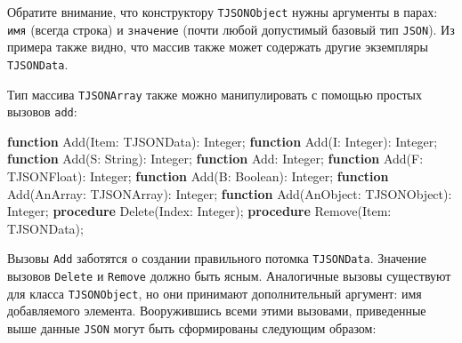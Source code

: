 \documentclass[
]{article}
\newenvironment{Shaded}{}{}
\newcommand{\DataTypeTok}[1]{\textcolor[rgb]{0.56,0.13,0.00}{#1}}
\newcommand{\KeywordTok}[1]{\textcolor[rgb]{0.00,0.44,0.13}{\textbf{#1}}}
\newcommand{\NormalTok}[1]{#1}
\begin{document}
Обратите внимание, что конструктору \texttt{TJSONObject} нужны аргументы
в парах: \texttt{имя} (всегда строка) и \texttt{значение} (почти любой
допустимый базовый тип \texttt{JSON}). Из примера также видно, что
массив также может содержать другие экземпляры \texttt{TJSONData}.

Тип массива \texttt{TJSONArray} также можно манипулировать с помощью
простых вызовов \texttt{add}:

\begin{Shaded}
\begin{Highlighting}[]
\KeywordTok{function}\NormalTok{ Add(Item: TJSONData): }\DataTypeTok{Integer}\NormalTok{;}
\KeywordTok{function}\NormalTok{ Add(I: }\DataTypeTok{Integer}\NormalTok{): }\DataTypeTok{Integer}\NormalTok{;}
\KeywordTok{function}\NormalTok{ Add(S: }\DataTypeTok{String}\NormalTok{): }\DataTypeTok{Integer}\NormalTok{;}
\KeywordTok{function}\NormalTok{ Add: }\DataTypeTok{Integer}\NormalTok{;}
\KeywordTok{function}\NormalTok{ Add(F: TJSONFloat): }\DataTypeTok{Integer}\NormalTok{;}
\KeywordTok{function}\NormalTok{ Add(B: }\DataTypeTok{Boolean}\NormalTok{): }\DataTypeTok{Integer}\NormalTok{;}
\KeywordTok{function}\NormalTok{ Add(AnArray: TJSONArray): }\DataTypeTok{Integer}\NormalTok{;}
\KeywordTok{function}\NormalTok{ Add(AnObject: TJSONObject): }\DataTypeTok{Integer}\NormalTok{;}
\KeywordTok{procedure}\NormalTok{ Delete(Index: }\DataTypeTok{Integer}\NormalTok{);}
\KeywordTok{procedure}\NormalTok{ Remove(Item: TJSONData);}
\end{Highlighting}
\end{Shaded}

Вызовы \texttt{Add} заботятся о создании правильного потомка
\texttt{TJSONData}. Значение вызовов \texttt{Delete} и \texttt{Remove}
должно быть ясным. Аналогичные вызовы существуют для класса
\texttt{TJSONObject}, но они принимают дополнительный аргумент: имя
добавляемого элемента. Вооружившись всеми этими вызовами, приведенные
выше данные \texttt{JSON} могут быть сформированы следующим образом:
\end{document}
